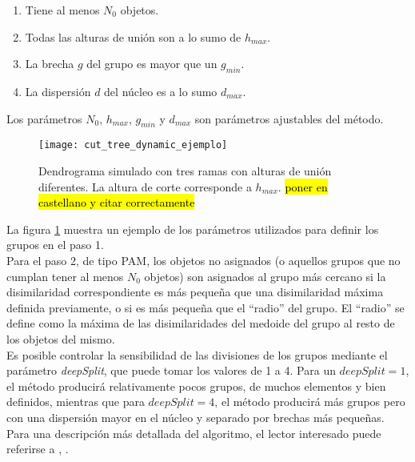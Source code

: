 \begin{enumerate}
\item Tiene al menos $N_0$ objetos.
\item Todas las alturas de unión son a lo sumo de $h_{max}$.
\item La brecha $g$ del grupo es mayor que un $g_{min}$.
\item La dispersión $d$ del núcleo es a lo sumo $d_{max}$.
\end{enumerate}
Los parámetros $N_0$, $h_{max}$, $g_{min}$ y $d_{max}$ son parámetros ajustables del método.
\begin{figure}[h]
    \centering
    \texttt{[image: cut\_tree\_dynamic\_ejemplo]}
    \caption{Dendrograma simulado con tres ramas con alturas de unión diferentes. La altura de corte corresponde a $h_{max}$. \hl{poner en castellano y citar correctamente}}
    \label{fig:cut_tree_dynamic_ejemplo}
\end{figure}
La figura \ref{fig:cut_tree_dynamic_ejemplo} muestra un ejemplo de los parámetros utilizados para definir los grupos en el paso 1.\\
Para el paso 2, de tipo PAM, los objetos no asignados (o aquellos grupos que no cumplan tener al menos $N_0$ objetos) son asignados al grupo más cercano si la disimilaridad correspondiente es más pequeña que una disimilaridad máxima definida previamente, o si es más pequeña que el ``radio'' del grupo. El ``radio'' se define como la máxima de las disimilaridades del medoide del grupo al resto de los objetos del mismo.\\
Es posible controlar la sensibilidad de las divisiones de los grupos mediante el parámetro \textit{deepSplit}, que puede tomar los valores de 1 a 4. Para un $deepSplit=1$, el método producirá relativamente pocos grupos, de muchos elementos y bien definidos, mientras que para $deepSplit=4$, el método producirá más grupos pero con una dispersión mayor en el núcleo y separado por brechas más pequeñas.\\
Para una descripción más detallada del algoritmo, el lector interesado puede referirse a \cite{Langfelder2008}, \cite{Langfelder2007}.
